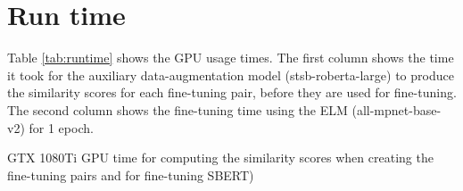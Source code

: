 \documentclass[sigconf, anonymous=true]{acmart}
\begin{document}
\section{Run time}
\label{sec:runtime}
Table \ref{tab:runtime} shows the GPU usage times. The first column shows the time it took for the auxiliary data-augmentation model (stsb-roberta-large) to produce the similarity scores for each fine-tuning pair, before they are used for fine-tuning. The second column shows the fine-tuning time using the ELM (all-mpnet-base-v2) for 1 epoch.

\begin{table}[H]
\setlength{} %
\footnotesize\centering
{}
\caption{GTX 1080Ti GPU time for computing the similarity scores when creating the fine-tuning pairs and for fine-tuning SBERT)}
\label{tab:runtime}
\end{table}
\end{document}

